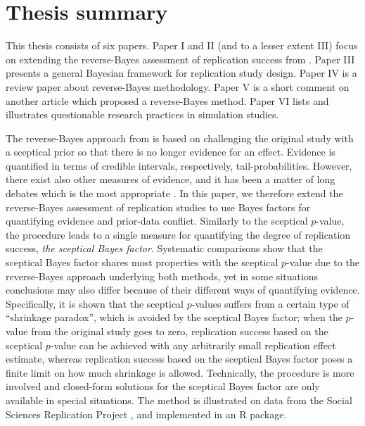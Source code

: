 \newpage
\section{Thesis summary}
\label{sec:summary}
\raggedbottom

This thesis consists of six papers. Paper I and II (and to a lesser extent III)
focus on extending the reverse-Bayes assessment of replication success from
\citet{Held2020}. Paper III presents a general Bayesian framework for
replication study design. Paper IV is a review paper about reverse-Bayes
methodology. Paper V is a short comment on another article which proposed a
reverse-Bayes method. Paper VI lists and illustrates questionable research
practices in simulation studies.



The reverse-Bayes approach from \citet{Held2020} is based on challenging the
original study with a sceptical prior so that there is no longer evidence for an
effect. Evidence is quantified in terms of credible intervals, respectively,
tail-probabilities. However, there exist also other measures of evidence, and it
has been a matter of long debates which is the most appropriate \citep[see
\eg{}][]{Berger1987, Casella1987, Royall1997, Berger2003, Benjamin2017,
  Lakens2018, Amrhein2019b}. In this paper, we therefore extend the
reverse-Bayes assessment of replication studies to use Bayes factors
\citep{Good1958, Jeffreys1961} for quantifying evidence and prior-data
conflict. %
Similarly to the sceptical $p$-value, the procedure leads to a single measure
for quantifying the degree of replication success, \emph{the sceptical Bayes
  factor}. Systematic comparisons show that the sceptical Bayes factor shares
most properties with the sceptical $p$-value due to the reverse-Bayes approach
underlying both methods, yet in some situations conclusions may also differ
because of their different ways of quantifying evidence. Specifically, it is
shown that the sceptical $p$-values suffers from a certain type of ``shrinkage
paradox'', which is avoided by the sceptical Bayes factor; when the $p$-value
from the original study goes to zero, replication success based on the sceptical
$p$-value can be achieved with any arbitrarily small replication effect
estimate, whereas replication success based on the sceptical Bayes factor poses
a finite limit on how much shrinkage is allowed. Technically, the procedure is
more involved and closed-form solutions for the sceptical Bayes factor are only
available in special situations. %
The method is illustrated on data from the Social Sciences Replication Project
\citep{Camerer2018}, and implemented in an R package.

